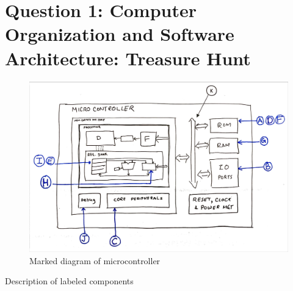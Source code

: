 \section*{Question 1: \small{Computer Organization and Software Architecture: Treasure Hunt}}

\begin{figure}[h]
    \centering
    \includegraphics[width=\linewidth]{figures/images/q1.jpeg}
    \caption{Marked diagram of microcontroller}
\end{figure}

\begin{table}[h]
    \centering
    \resizebox{\textwidth}{!}{
        
    }
    \caption{
        Description of labeled components
    }\label{tab:q1}
\end{table}
